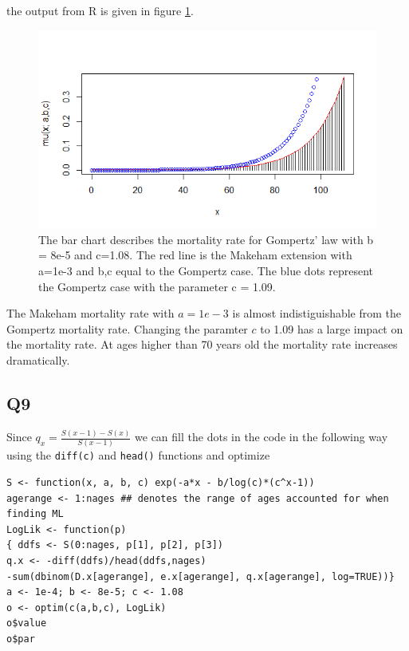 the output from R is given in figure \ref{Figure_Question8}.
\begin{center}
\begin{figure}

\includegraphics[scale=1]{Question_8_MakehamGompertz.png}

\caption{The bar chart describes the mortality rate for Gompertz' law with b = 8e-5 and c=1.08. The red line is the Makeham extension with a=1e-3 and b,c equal to the Gompertz case. The blue dots represent
the Gompertz case with the parameter c = 1.09.}
\label{Figure_Question8}

\end{figure}
\end{center}

The Makeham mortality rate with $a = 1e-3$ is almost indistiguishable from the Gompertz mortality rate. Changing the paramter $c$ to 1.09 has a large impact on the mortality rate. At ages higher than 70 years old the mortality rate increases dramatically.


\subsection*{Q9}

Since $q_x = \frac{S(x-1) - S(x)}{S(x-1)}$ we can fill the dots in the code in the following way using the \verb+diff(c)+ and \verb+head()+ functions and optimize

\begin{verbatim}
S <- function(x, a, b, c) exp(-a*x - b/log(c)*(c^x-1))
agerange <- 1:nages ## denotes the range of ages accounted for when finding ML
LogLik <- function(p)
{ ddfs <- S(0:nages, p[1], p[2], p[3])
q.x <- -diff(ddfs)/head(ddfs,nages)
-sum(dbinom(D.x[agerange], e.x[agerange], q.x[agerange], log=TRUE))}
a <- 1e-4; b <- 8e-5; c <- 1.08
o <- optim(c(a,b,c), LogLik) 
o$value
o$par
\end{verbatim}

